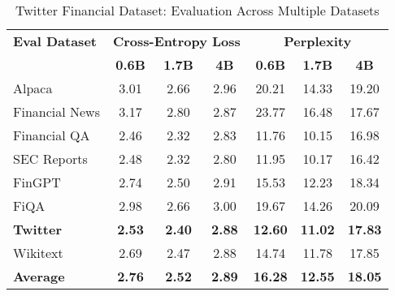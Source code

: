 
\begin{table}[h]
\centering
\caption[Twitter Financial: Evaluation Results]{Twitter Financial Dataset: Evaluation Across Multiple Datasets}
\label{tab:twitter_results}
\begin{tabular}{l|ccc|ccc}
\hline
\textbf{Eval Dataset} & \multicolumn{3}{c|}{\textbf{Cross-Entropy Loss}} & \multicolumn{3}{c}{\textbf{Perplexity}} \\
\cline{2-4} \cline{5-7}
  & \textbf{0.6B} & \textbf{1.7B} & \textbf{4B} & \textbf{0.6B} & \textbf{1.7B} & \textbf{4B} \\
Alpaca & 3.01 & 2.66 & 2.96 & 20.21 & 14.33 & 19.20 \\
Financial News & 3.17 & 2.80 & 2.87 & 23.77 & 16.48 & 17.67 \\
Financial QA & 2.46 & 2.32 & 2.83 & 11.76 & 10.15 & 16.98 \\
SEC Reports & 2.48 & 2.32 & 2.80 & 11.95 & 10.17 & 16.42 \\
FinGPT & 2.74 & 2.50 & 2.91 & 15.53 & 12.23 & 18.34 \\
FiQA & 2.98 & 2.66 & 3.00 & 19.67 & 14.26 & 20.09 \\
\textbf{Twitter} & \textbf{2.53} & \textbf{2.40} & \textbf{2.88} & \textbf{12.60} & \textbf{11.02} & \textbf{17.83} \\
Wikitext & 2.69 & 2.47 & 2.88 & 14.74 & 11.78 & 17.85 \\
\hline
\textbf{Average} & \textbf{2.76} & \textbf{2.52} & \textbf{2.89} & \textbf{16.28} & \textbf{12.55} & \textbf{18.05} \\
\hline
\end{tabular}
\end{table}
